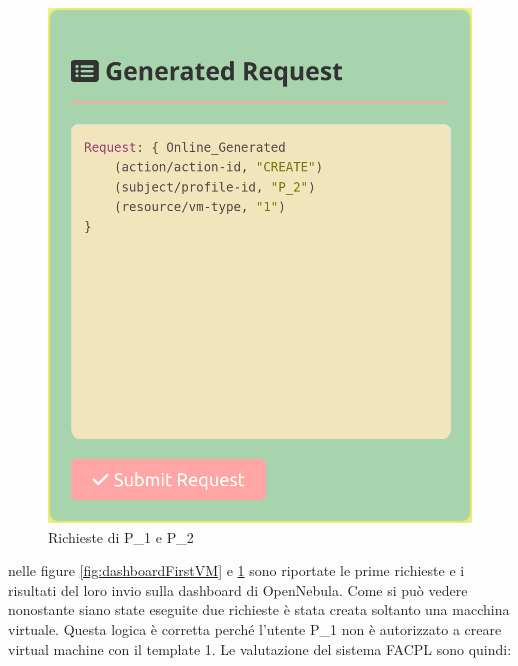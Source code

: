 \begin{figure}[H]
\begin{minipage}{0.49\textwidth}
        \includegraphics[width=\textwidth]{tesi_screenshot/P2Create_1.png}
    \end{minipage}
    \caption{Richieste di P\_1 e P\_2}
    \label{fig:richiesteCreazione}
\end{figure}
nelle figure \ref{fig:dashboardFirstVM} e \ref{fig:richiesteCreazione} sono riportate le prime richieste e i risultati del loro invio sulla dashboard di OpenNebula.
Come si può vedere nonostante siano state eseguite due richieste è stata creata soltanto una macchina virtuale. Questa logica è corretta perché l'utente P\_1 non è autorizzato a creare virtual machine con il template 1. Le valutazione del sistema FACPL sono quindi:
